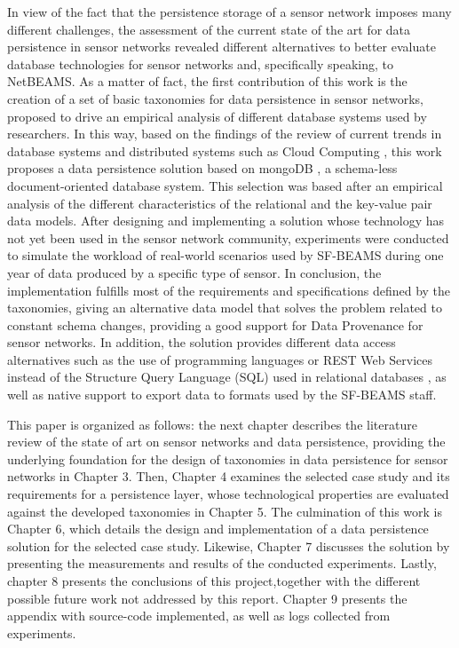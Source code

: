 In view of the fact that the persistence storage of a sensor network imposes
many different challenges, the assessment of the current state of the art for
data persistence in sensor networks revealed different alternatives to better
evaluate database technologies for sensor networks and, specifically speaking,
to NetBEAMS. As a matter of fact, the first contribution of this work is the
creation of a set of basic taxonomies for data persistence in sensor networks,
proposed to drive an empirical analysis of different database systems used by
researchers. In this way, based on the findings of the review of current trends
in database systems \cite{db-is-rdbs-dommed, db-shard-intro} and distributed
systems such as Cloud Computing \cite{cloud-comp-survey}, this work proposes a
data persistence solution based on mongoDB \cite{mongodb}, a schema-less
document-oriented database system. This selection was based after an empirical
analysis of the different characteristics of the relational
\cite{relational-model} and the key-value pair \cite{db-kvp} data models.
After designing and implementing a solution whose technology has not yet been
used in the sensor network community, experiments were conducted to simulate
the workload of real-world scenarios used by SF-BEAMS during one year of data
produced by a specific type of sensor. In conclusion, the implementation
fulfills most of the requirements and specifications defined by the taxonomies,
giving an alternative data model that solves the problem related to constant
schema changes, providing a good support for Data Provenance
\cite{sn-provenance} for sensor networks. In addition, the solution provides
different data access alternatives such as the use of programming languages or
REST Web Services \cite{http-rest} instead of the Structure Query Language (SQL)
\cite{sql} used in relational databases \cite{relational-model}, as well as
native support to export data to formats used by the SF-BEAMS staff.

This paper is organized as follows: the next chapter describes the literature
review of the state of art on sensor networks and data persistence, providing
the underlying foundation for the design of taxonomies in data persistence for
sensor networks in Chapter 3. Then, Chapter 4 examines the selected case study
and its requirements for a persistence layer, whose technological properties are
evaluated against the developed taxonomies in Chapter 5. The culmination of
this work is Chapter 6, which details the design and implementation of a data
persistence solution for the selected case study. Likewise, Chapter 7 discusses
the solution by presenting the measurements and results of the conducted
experiments. Lastly, chapter 8 presents the conclusions of this
project,together with the different possible future work not addressed by this
report. Chapter 9 presents the appendix with source-code implemented, as well as
logs collected from experiments.
